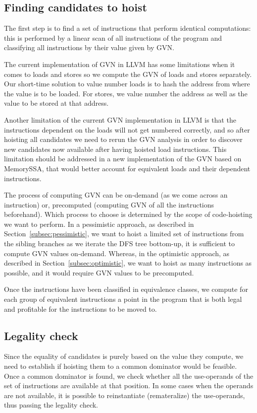 \documentclass{sig-alternate}
\begin{document}
\subsection{Finding candidates to hoist}
The first step is to find a set of instructions that perform identical
computations: this is performed by a linear scan of all instructions of the
program and classifying all instructions by their value given by GVN.

The current implementation of GVN in LLVM has some limitations when it comes to
loads and stores so we compute the GVN of loads and stores separately.  Our
short-time solution to value number loads is to hash the address from where the
value is to be loaded. For stores, we value number the address as well as the
value to be stored at that address.

Another limitation of the current GVN implementation in LLVM is that the
instructions dependent on the loads will not get numbered correctly, and so
after hoisting all candidates we need to rerun the GVN analysis in order to
discover new candidates now available after having hoisted load instructions.
This limitation should be addressed in a new implementation of the GVN based on
MemorySSA, that would better account for equivalent loads and their dependent
instructions.

The process of computing GVN can be on-demand (as we come across an instruction)
or, precomputed (computing GVN of all the instructions beforehand). Which
process to choose is determined by the scope of code-hoisting we want to
perform. In a pessimistic approach, as described in
Section~\ref{subsec:pessimistic}, we want to hoist a limited set of instructions
from the sibling branches as we iterate the DFS tree bottom-up, it is sufficient
to compute GVN values on-demand. Whereas, in the optimistic approach, as
described in Section~\ref{subsec:optimistic}, we want to hoist as many
instructions as possible, and it would require GVN values to be precomputed.

Once the instructions have been classified in equivalence classes, we compute
for each group of equivalent instructions a point in the program that is both
legal and profitable for the instructions to be moved to.

\subsection{Legality check}
\label{subsec:legality}
Since the equality of candidates is purely based on the value they compute, we
need to establish if hoisting them to a common dominator would be feasible. Once
a common dominator is found, we check whether all the use-operands of the set of
instructions are available at that position. In some cases when the operands are not
available, it is possible to reinstantiate (remateralize) the use-operands, thus
passing the legality check.
\end{document}
